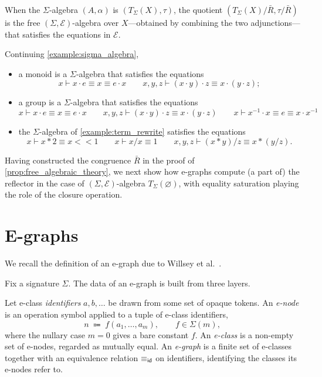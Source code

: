 When the $\Sigma$-algebra $(A, \alpha)$ is $(T_{\Sigma}(X), \tau)$, the quotient $(T_{\Sigma}(X) / \bar{R}, \tau / \bar{R})$ is the free $(\Sigma, \mathcal{E})$-algebra over $X$---obtained by combining the two adjunctions---that satisfies the equations in $\mathcal{E}$.
\begin{example}
Continuing \cref{example:sigma_algebra}, 
\begin{itemize}
\item a monoid is a $\Sigma$-algebra that satisfies the equations
\[
x \vdash x \cdot e \equiv x \equiv e \cdot x \qquad x, y, z \vdash (x \cdot y) \cdot z \equiv x \cdot (y \cdot z);
\]
\item a group is a $\Sigma$-algebra that satisfies the equations
\[
x \vdash x \cdot e \equiv x \equiv e \cdot x \qquad x, y, z \vdash (x \cdot y) \cdot z \equiv x \cdot (y \cdot z) \qquad x \vdash x^{-1} \cdot x \equiv e \equiv x \cdot x^{-1}
\]
\item the $\Sigma$-algebra of \cref{example:term_rewrite} satisfies the equations
\[
x \vdash x * 2 \equiv x <\!\!< 1 \qquad x \vdash x / x \equiv 1 \qquad x, y, z \vdash (x * y) / z \equiv x * (y / z) .
\]
\end{itemize}
\end{example}

Having constructed the congruence $\bar{R}$ in the proof of \cref{prop:free_algebraic_theory}, we next show how e-graphs compute (a part of) the reflector in the case of $(\Sigma, \mathcal{E})$-algebra $T_\Sigma(\varnothing)$, with equality saturation playing the role of the closure operation. 


\section{E-graphs}
We recall the definition of an e-graph due to Willsey et al.~\cite{EggPaper}.

Fix a signature $\Sigma$. The data of an e-graph is built from three layers.

\begin{definition}
\label{def:egraph}
Let e-class \emph{identifiers} $a, b, \dots$ be drawn from some set of
opaque tokens. An \emph{e-node} is an operation symbol applied to a
tuple of e-class identifiers,
\[
n \;\Coloneqq\; f(a_1, \dots, a_m), \qquad f \in \Sigma(m),
\]
where the nullary case $m = 0$ gives a bare constant $f$. An
\emph{e-class} is a non-empty set of e-nodes, regarded as mutually
equal. An \emph{e-graph} is a finite set of e-classes
together with an equivalence relation $\equiv_{\sf id}$ on identifiers,
identifying the classes its e-nodes refer to.
\end{definition}

